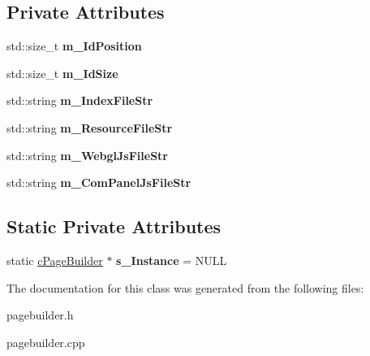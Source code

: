 \subsection*{\-Private \-Attributes}
\begin{DoxyCompactItemize}
\item 
\hypertarget{classhttp__server_1_1cPageBuilder_a98fc3701625a6e09deb368eca4aae6da}{std\-::size\-\_\-t {\bfseries m\-\_\-\-Id\-Position}}\label{classhttp__server_1_1cPageBuilder_a98fc3701625a6e09deb368eca4aae6da}

\item 
\hypertarget{classhttp__server_1_1cPageBuilder_a2a5da5d3ab0f9f61046e2111ea36b039}{std\-::size\-\_\-t {\bfseries m\-\_\-\-Id\-Size}}\label{classhttp__server_1_1cPageBuilder_a2a5da5d3ab0f9f61046e2111ea36b039}

\item 
\hypertarget{classhttp__server_1_1cPageBuilder_a2c4b56ac0d42ba3d9d20945839082ef5}{std\-::string {\bfseries m\-\_\-\-Index\-File\-Str}}\label{classhttp__server_1_1cPageBuilder_a2c4b56ac0d42ba3d9d20945839082ef5}

\item 
\hypertarget{classhttp__server_1_1cPageBuilder_adc3bb5aec5159c7556a6012562faf9f0}{std\-::string {\bfseries m\-\_\-\-Resource\-File\-Str}}\label{classhttp__server_1_1cPageBuilder_adc3bb5aec5159c7556a6012562faf9f0}

\item 
\hypertarget{classhttp__server_1_1cPageBuilder_ab042991bd624949e0a45d62e975dacdd}{std\-::string {\bfseries m\-\_\-\-Webgl\-Js\-File\-Str}}\label{classhttp__server_1_1cPageBuilder_ab042991bd624949e0a45d62e975dacdd}

\item 
\hypertarget{classhttp__server_1_1cPageBuilder_acff93f71f4bbc839dba06b1732ea3fa2}{std\-::string {\bfseries m\-\_\-\-Com\-Panel\-Js\-File\-Str}}\label{classhttp__server_1_1cPageBuilder_acff93f71f4bbc839dba06b1732ea3fa2}

\end{DoxyCompactItemize}
\subsection*{\-Static \-Private \-Attributes}
\begin{DoxyCompactItemize}
\item 
\hypertarget{classhttp__server_1_1cPageBuilder_a5857987a8133c3768bac833850d12613}{static \hyperlink{classhttp__server_1_1cPageBuilder}{c\-Page\-Builder} $\ast$ {\bfseries s\-\_\-\-Instance} = \-N\-U\-L\-L}\label{classhttp__server_1_1cPageBuilder_a5857987a8133c3768bac833850d12613}

\end{DoxyCompactItemize}


\-The documentation for this class was generated from the following files\-:\begin{DoxyCompactItemize}
\item 
pagebuilder.\-h\item 
pagebuilder.\-cpp\end{DoxyCompactItemize}
